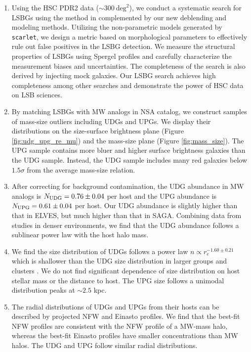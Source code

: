 \documentclass[twocolumn,astrosymb,twocolappendix]{aastex631}
\newcommand{\code}[1]{\texttt{#1}}
\begin{document}
\begin{CJK*}{UTF8}{gbsn}
\begin{enumerate}

    \item Using the HSC PDR2 data ($\sim 300\ \mathrm{deg}^{2}$), we conduct a systematic search for LSBGs using the method in \citet{Greco2018} complemented by our new deblending and modeling methods. Utilizing the non-parametric models generated by \code{scarlet}, we design a metric based on morphological parameters to effectively rule out false positives in the LSBG detection. We measure the structural properties of LSBGs using Spergel profiles and carefully characterize the measurement biases and uncertainties. The completeness of the search is also derived by injecting mock galaxies. Our LSBG search achieves high completeness among other searches and demonstrate the power of HSC data on LSB sciences. 
    
    \item By matching LSBGs with MW analogs in NSA catalog, we construct samples of mass-size outliers including UDGs and UPGs. We display their distributions on the size-surface brightness plane (Figure \ref{fig:udg_upg_re_mu}) and the mass-size plane (Figure \ref{fig:mass_size}). The UPG sample contains more bluer and higher surface brightness galaxies than the UDG sample. Instead, the UDG sample includes many red galaxies below $1.5\sigma$ from the average mass-size relation.
    
    \item After correcting for background contamination, the UDG abundance in MW analogs is $N_{\rm UDG} = 0.76\pm 0.04$ per host and the UPG abundance is $N_{\rm UPG} = 0.61 \pm 0.04$ per host. Our UDG abundance is slightly higher than that in ELVES, but much higher than that in SAGA. Combining data from studies in denser environments, we find that the UDG abundance follows a sublinear power law with the host halo mass. 
    \item We find the size distribution of UDGs follows a power law $n\propto r_e^{-1.60\pm0.21}$ which is shallower than the UDG size distribution in larger groups and clusters \citep{vdBurg2016,vdBurg2017}. We do not find significant dependence of size distribution on host stellar mass or the distance to host. The UPG size follows a unimodal distribution peaks at $\sim 2.5$ kpc. 
    
    \item The radial distributions of UDGs and UPGs from their hosts can be described by projected NFW and Einasto profiles. We find that the best-fit NFW profiles are consistent with the NFW profile of a MW-mass halo, whereas the best-fit Einasto profiles have smaller concentrations than MW halos. The UDG and UPG follow similar radial distributions.
    

\end{enumerate}
\end{CJK*}
\end{document}
